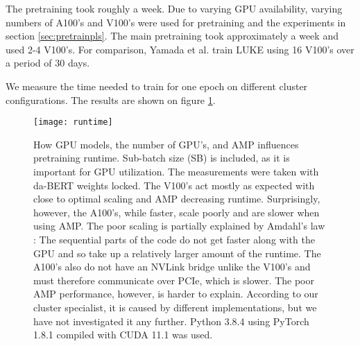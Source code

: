 \documentclass[main.tex]{subfiles}
\begin{document}
The pretraining took roughly a week.
Due to varying GPU availability, varying numbers of A100's and V100's were used for pretraining and the experiments in section \ref{sec:pretrainpls}.
The main pretraining took approximately a week and used 2-4 V100's.
For comparison, Yamada et al. train LUKE using 16 V100's over a period of 30 days. \cite{yamada2020luke}

We measure the time needed to train for one epoch on different cluster configurations.
The results are shown on figure \ref{fig:runtime}.
\begin{figure}[H]
    \centering
    \texttt{[image: runtime]}
    \caption{
        How GPU models, the number of GPU's, and AMP influences pretraining runtime.
        Sub-batch size (SB) is included, as it is important for GPU utilization.
        The measurements were taken with da-BERT weights locked.
        The V100's act mostly as expected with close to optimal scaling and AMP decreasing runtime.
        Surprisingly, however, the A100's, while faster, scale poorly and are slower when using AMP.
        The poor scaling is partially explained by Amdahl's law \cite{klein2011amdahl}: The sequential parts of the code do not get faster along with the GPU and so take up a relatively larger amount of the runtime.
        The A100's also do not have an NVLink bridge unlike the V100's and must therefore communicate over PCIe, which is slower.
        The poor AMP performance, however, is harder to explain.
        According to our cluster specialist, it is caused by different  implementations, but we have not investigated it any further.
        Python 3.8.4 using PyTorch 1.8.1 compiled with CUDA 11.1 was used.
    }
    \label{fig:runtime}
\end{figure}\noindent
\end{document}
